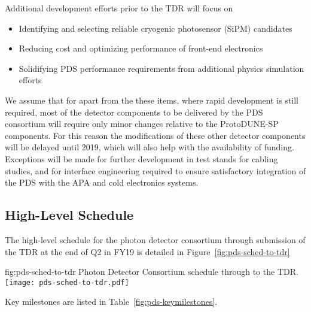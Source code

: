 Additional development efforts prior to the TDR will focus on

\begin{itemize}
\item Identifying and selecting reliable cryogenic photosensor (SiPM) candidates
\item Reducing cost and optimizing performance of front-end electronics
\item Solidifying PDS performance requirements from additional physics simulation efforts
\end{itemize}

We assume that for apart from the these items, where rapid development is still
required, most of the detector components to be delivered by the PDS consortium
will require only minor changes relative to the ProtoDUNE-SP components. For this reason the modifications of these other detector components will be delayed until \num{2019}, which will also help with the availability of funding. Exceptions will be made for further development in test stands for cabling studies, and for interface engineering required to ensure satisfactory integration of the PDS with the APA and cold electronics systems.


\subsection{High-Level Schedule}
\label{sec:fdsp-pd-org-cs}

The high-level schedule for the photon detector consortium through submission of the TDR at the end of Q2 in FY19 is detailed in Figure~\ref{fig:pds-sched-to-tdr}
\begin{dunefigure}{fig:pds-sched-to-tdr}
{Photon Detector Consortium schedule through to the TDR.}
 \texttt{[image: pds-sched-to-tdr.pdf]}
\end{dunefigure}


Key milestones are listed in Table~\ref{fig:pds-keymilestones}.

